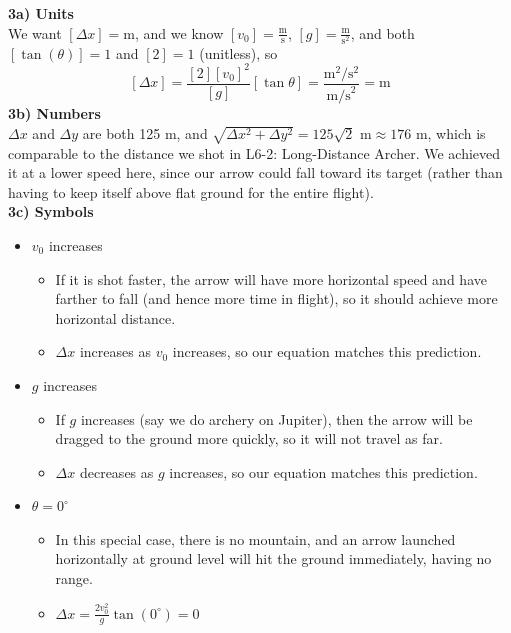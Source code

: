 \documentclass[]{article}
\begin{document}
\begin{TeacherMargin}
	\noindent\textbf{3a) Units} \\
	We want $[\Delta x] = \text{m}$, and we know $[v_{0}]=\frac{\text{m}}{\text{s}}$, $[g]=\frac{\text{m}}{\text{s}^{2}}$, and both $[\tan(\theta)]=1$ and $[2]=1$ (unitless), so
	\[
	[\Delta x] = \frac{[2][v_{0}]^{2}}{[g]}[\tan\theta] = \frac{\text{m}^{2}/\text{s}^{2}}{\text{m/s}^{2}} = \text{m}
	\]
	\textbf{3b) Numbers} \\
	$\Delta x$ and $\Delta y$ are both 125 m, and $\sqrt{\Delta x^{2}+\Delta y^{2}} = 125\sqrt{2}\text{ m} \approx 176$ m, which is comparable to the distance we shot in L6-2: Long-Distance Archer. We achieved it at a lower speed here, since our arrow could fall toward its target (rather than having to keep itself above flat ground for the entire flight). \\
	\textbf{3c) Symbols}
	\begin{itemize}
		\item $v_{0}$ increases
		\begin{itemize}
			\item If it is shot faster, the arrow will have more horizontal speed and have farther to fall (and hence more time in flight), so it should achieve more horizontal distance.
			\item $\Delta x$ increases as $v_{0}$ increases, so our equation matches this prediction.
		\end{itemize}
		\item $g$ increases
		\begin{itemize}
			\item If $g$ increases (say we do archery on Jupiter), then the arrow will be dragged to the ground more quickly, so it will not travel as far.
			\item $\Delta x$ decreases as $g$ increases, so our equation matches this prediction.
		\end{itemize}
		\item $\theta=0^{\circ}$
		\begin{itemize}
			\item In this special case, there is no mountain, and an arrow launched horizontally at ground level will hit the ground immediately, having no range.
			\item $\Delta x = \frac{2v_{0}^{2}}{g}\tan(0^{\circ}) = 0$
		\end{itemize}
	\end{itemize}
\end{TeacherMargin}
\end{document}
